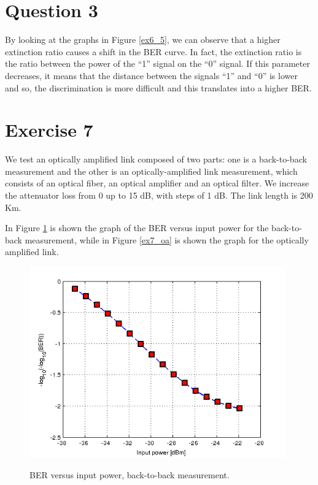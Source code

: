 \documentclass[a4paper,10pt]{report}
\begin{document}
\newpage
\section*{Question 3}
By looking at the graphs in Figure \ref{ex6_5}, we can observe that a higher extinction ratio causes a shift in the BER curve.
In fact, the extinction ratio is the ratio between the power of the ``1'' signal on the ``0'' signal.
If this parameter decreases, it means that the distance between the signals ``1'' and ``0'' is lower and so, the discrimination is more
difficult and this translates into a higher BER.



\section*{Exercise 7}
We test an optically amplified link composed of two parts: one is a back-to-back measurement and the other is an
optically-amplified link measurement, which consists of an optical fiber, an optical amplifier and an optical filter.
We increase the attenuator loss from 0 up to 15 dB, with steps of 1 dB. The link length is 200 Km.

In Figure \ref{ex7_bb} is shown the graph of the BER versus input power for the back-to-back measurement, while in Figure \ref{ex7_oa}
is shown the graph for the optically amplified link.

\begin{figure}[!ht]
   \centering
   \includegraphics[width=11cm]{ex7_bb.png}\\
   \caption{BER versus input power, back-to-back measurement.}
   \label{ex7_bb}
\end{figure}
\end{document}
